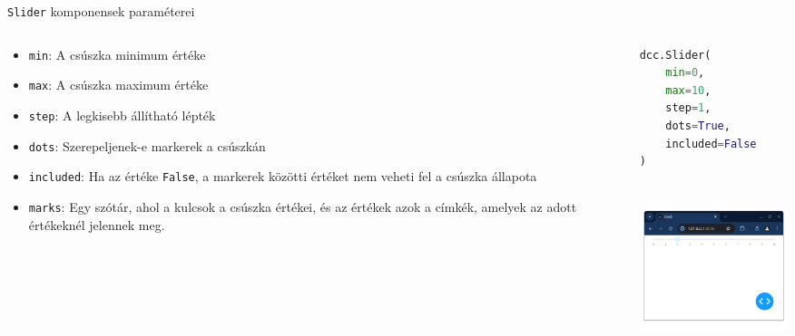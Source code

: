 \documentclass[english, aspectratio=169]{beamer}
\begin{document}
	\begin{frame}[fragile]{\texttt{Slider} komponensek paraméterei}
		\begin{columns}
			\begin{column}{.5\textwidth}
				\begin{itemize}
					\item \texttt{min}: A csúszka minimum értéke
					\item \texttt{max}: A csúszka maximum értéke
					\item \texttt{step}: A legkisebb állítható lépték
					\item \texttt{dots}: Szerepeljenek-e markerek a csúszkán
					\item \texttt{included}: Ha az értéke \texttt{False}, a markerek közötti értéket nem veheti fel a csúszka állapota
					\item \texttt{marks}: Egy szótár, ahol a kulcsok a csúszka értékei, és az értékek azok a címkék, amelyek az adott értékeknél jelennek meg.
				\end{itemize}
			\end{column}
			\begin{column}{.5\textwidth}
				\begin{lstlisting}[language=python]
dcc.Slider(
	min=0,
	max=10,
	step=1,
	dots=True,
	included=False
)				
				\end{lstlisting}
				\begin{center}
					\includegraphics[width=5cm, height=5cm, keepaspectratio]{images/scatter_17.png}
				\end{center}
			\end{column}
		\end{columns}
	\end{frame}
	
\end{document}
